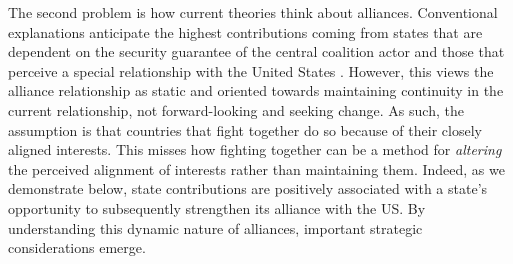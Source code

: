 \documentclass[12pt,letterpaper]{article}
\begin{document}
		The second problem is how current theories think about alliances. Conventional explanations anticipate the highest contributions coming from states that are dependent on the security guarantee of the central coalition actor and those that perceive a special relationship with the United States \citep{haesebrouck_democraticparticipationair_2016, howorth_securitydefencepolicy_2014, graeger_revivalatlanticismnato_2009, biehl_strategiccultureseurope_2013}. However, this views the alliance relationship as static and oriented towards maintaining continuity in the current relationship, not forward-looking and seeking change. As such, the assumption is that countries that fight together do so because of their closely aligned interests. This misses how fighting together can be a method for \textit{altering} the perceived alignment of interests rather than maintaining them. 
		Indeed, as we demonstrate below, state contributions are positively associated with a state's opportunity to subsequently strengthen its alliance with the US. By understanding this dynamic nature of alliances, important strategic considerations emerge.

		
\end{document}
